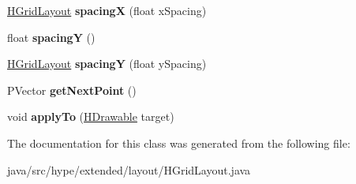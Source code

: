 \begin{DoxyCompactItemize}
\item 
\hypertarget{classhype_1_1extended_1_1layout_1_1_h_grid_layout_aff8cac2dbcdc14dedafe8b8b6353f93f}{\hyperlink{classhype_1_1extended_1_1layout_1_1_h_grid_layout}{H\-Grid\-Layout} {\bfseries spacing\-X} (float x\-Spacing)}\label{classhype_1_1extended_1_1layout_1_1_h_grid_layout_aff8cac2dbcdc14dedafe8b8b6353f93f}

\item 
\hypertarget{classhype_1_1extended_1_1layout_1_1_h_grid_layout_ad1b4de2c7edd4a966803bcb7dd97644c}{float {\bfseries spacing\-Y} ()}\label{classhype_1_1extended_1_1layout_1_1_h_grid_layout_ad1b4de2c7edd4a966803bcb7dd97644c}

\item 
\hypertarget{classhype_1_1extended_1_1layout_1_1_h_grid_layout_aa0b3975d5902e33fca531c3bee9d875c}{\hyperlink{classhype_1_1extended_1_1layout_1_1_h_grid_layout}{H\-Grid\-Layout} {\bfseries spacing\-Y} (float y\-Spacing)}\label{classhype_1_1extended_1_1layout_1_1_h_grid_layout_aa0b3975d5902e33fca531c3bee9d875c}

\item 
\hypertarget{classhype_1_1extended_1_1layout_1_1_h_grid_layout_a98415dde6651010b4cb6b72cf5726a41}{P\-Vector {\bfseries get\-Next\-Point} ()}\label{classhype_1_1extended_1_1layout_1_1_h_grid_layout_a98415dde6651010b4cb6b72cf5726a41}

\item 
\hypertarget{classhype_1_1extended_1_1layout_1_1_h_grid_layout_a9bd8ea51cebe5da2f0430dc50c3d385e}{void {\bfseries apply\-To} (\hyperlink{classhype_1_1core_1_1drawable_1_1_h_drawable}{H\-Drawable} target)}\label{classhype_1_1extended_1_1layout_1_1_h_grid_layout_a9bd8ea51cebe5da2f0430dc50c3d385e}

\end{DoxyCompactItemize}


The documentation for this class was generated from the following file\-:\begin{DoxyCompactItemize}
\item 
java/src/hype/extended/layout/H\-Grid\-Layout.\-java\end{DoxyCompactItemize}
